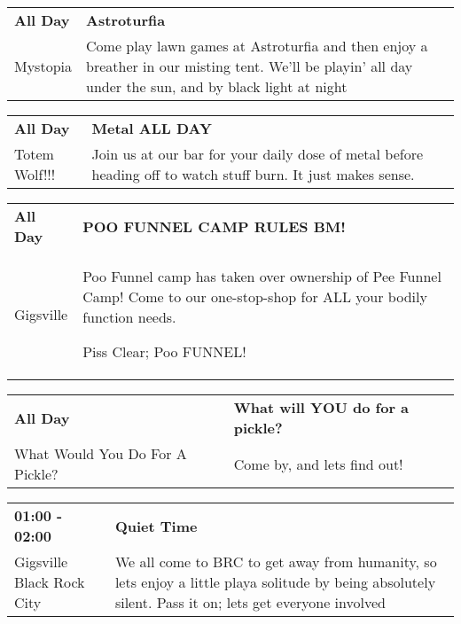 
\tiny{}

\begin{tabular}{ p{1in} p{2.2in} }
    \textbf{All Day} & \textbf{Astroturfia} \\
    Mystopia \newline  & Come play lawn games at Astroturfia and then enjoy a breather in our misting tent. We'll be playin' all day under the sun, and by black light at night \\
    \hline 
\end{tabular}
    
\begin{tabular}{ p{1in} p{2.2in} }
    \textbf{All Day} & \textbf{Metal ALL DAY } \\
    Totem Wolf!!! \newline  & Join us at our bar for your daily dose of metal before heading off to watch stuff burn. It just makes sense. \\
    \hline 
\end{tabular}
    
\begin{tabular}{ p{1in} p{2.2in} }
    \textbf{All Day} & \textbf{POO FUNNEL CAMP RULES BM!} \\
    Gigsville \newline  & Poo Funnel camp has taken over ownership of Pee Funnel Camp! Come to our one-stop-shop for ALL your bodily function needs.

Piss Clear;
Poo FUNNEL! \\
    \hline 
\end{tabular}
    
\begin{tabular}{ p{1in} p{2.2in} }
    \textbf{All Day} & \textbf{What will YOU do for a pickle?} \\
    What Would You Do For A Pickle? \newline  & Come by, and lets find out! \\
    \hline 
\end{tabular}
    
\begin{tabular}{ p{1in} p{2.2in} }
    \textbf{01:00 - 02:00} & \textbf{Quiet Time} \\
    Gigsville \newline Black Rock City & We all come to BRC to get away from humanity, so lets enjoy a little playa solitude by being absolutely silent. Pass it on; lets get everyone involved \\
    \hline 
\end{tabular}
    
